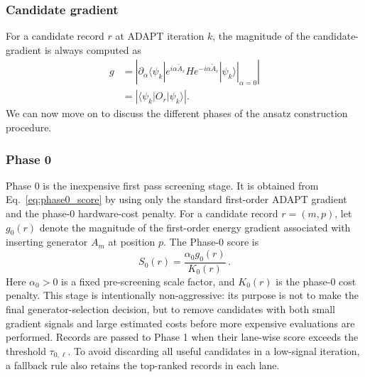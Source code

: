 \documentclass[
  reprint,
  amsmath,
  amssymb,
  aps,
  pra,
  nofootinbib,
  superscriptaddress,
  floatfix
]{revtex4-2}
\begin{document}
\subsubsection{Candidate gradient}
%
\noindent
For a candidate record $r$ at ADAPT iteration $k$, the magnitude of the candidate-gradient is always computed as 
\begin{equation}
\begin{aligned}
g
&=
\left|
\left.
\partial_\alpha
\langle\psi_k|
e^{i\alpha\widetilde A_r}
H
e^{-i\alpha\widetilde A_r}
|\psi_k\rangle
\right|_{\alpha=0}
\right|\\
&=
\left|\langle\psi_k|O_r|\psi_k\rangle\right| .
\end{aligned}
\label{eq:record_gradient}
\end{equation}
%
We can now move on to discuss the different phases of the ansatz construction procedure.

\subsubsection{Phase 0}
%
\noindent
Phase 0 is the inexpensive first pass screening stage. It is obtained from Eq.~\eqref{eq:phase0_score} by using only the standard first-order ADAPT gradient and the phase-0 hardware-cost penalty. For a candidate record \(r=(m,p)\), let \(g_0(r)\) denote the magnitude of the first-order energy gradient associated with inserting generator \(A_m\) at position \(p\). The Phase-0 score is
%
\begin{equation}
S_{0}(r)=\frac{\alpha_0 g_0(r)}{K_0(r)}\,.
\label{eq:phase0_score}
\end{equation}
%
Here \(\alpha_0>0\) is a fixed pre-screening scale factor, and \(K_0(r)\) is the phase-0 cost penalty. This stage is intentionally non-aggressive: its purpose is not to make the final generator-selection decision, but to remove candidates with both small gradient signals and large estimated costs before more expensive evaluations are performed. Records are passed to Phase 1 when their lane-wise score exceeds the threshold \(\tau_{0,\ell}\). To avoid discarding all useful candidates in a low-signal iteration, a fallback rule also retains the top-ranked records in each lane.
\end{document}
